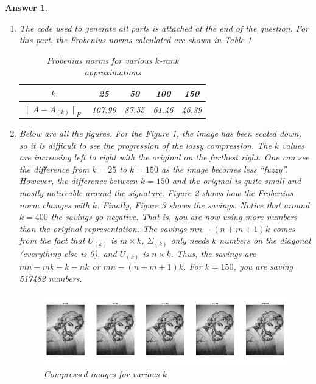 \documentclass[12pt]{article}
\theoremstyle{colon}
\newtheorem*{answer}{Answer}
\begin{document}
\begin{answer}
\begin{enumerate}[label=\arabic*)]
    \item The code used to generate all parts is attached at the end of the question. For this part, the Frobenius norms calculated are shown in Table 1.
      \begin{table}[ht]
        \begin{center}
          \begin{tabular}{ | c | c | c | c | c | }
            \hline
            $k$ & 25 & 50 & 100 & 150 \\
            \hline
            $\lVert A - A_{(k)} \rVert_F$ & 107.99 & 87.55 & 61.46 & 46.39 \\
            \hline
          \end{tabular}
        \end{center}
        \caption{Frobenius norms for various $k$-rank approximations}
      \end{table}

    \item Below are all the figures. For the Figure 1, the image has been scaled down, so it is difficult to see the progression of the lossy compression. The $k$ values are increasing left to right with the original on the furthest right. One can see the difference from $k = 25$ to $k = 150$ as the image becomes less ``fuzzy''. However, the difference between $k = 150$ and the original is quite small and mostly noticeable around the signature. Figure 2 shows how the Frobenius norm changes with $k$. Finally, Figure 3 shows the savings. Notice that around $k = 400$ the savings go negative. That is, you are now using more numbers than the original representation. The savings $mn - (n + m + 1)k$ comes from the fact that $U_{(k)}$ is $m \times k$, $\Sigma_{(k)}$ only needs $k$ numbers on the diagonal (everything else is 0), and $U_{(k)}$ is $n \times k$. Thus, the savings are $mn - mk - k - nk$ or $mn - (n + m + 1)k$. For $k = 150$, you are saving 517482 numbers.
      \begin{figure}[ht]
        \caption{Compressed images for various $k$}
        \centering
          \includegraphics[width=\textwidth]{part4.jpg}
      \end{figure}


\end{enumerate}
\end{answer}
\end{document}
